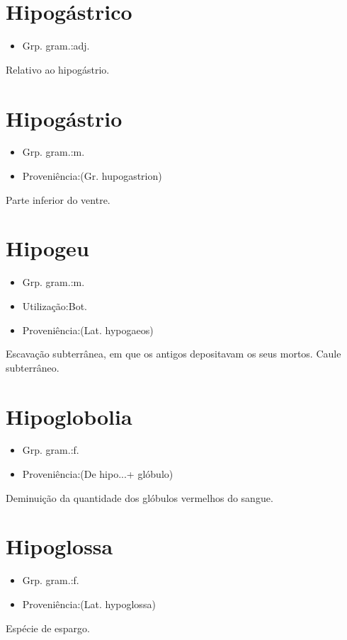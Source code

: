 \documentclass{article}
\begin{document}
\section{Hipogástrico}
\begin{itemize}
\item {Grp. gram.:adj.}
\end{itemize}
Relativo ao hipogástrio.
\section{Hipogástrio}
\begin{itemize}
\item {Grp. gram.:m.}
\end{itemize}
\begin{itemize}
\item {Proveniência:(Gr. \textunderscore hupogastrion\textunderscore )}
\end{itemize}
Parte inferior do ventre.
\section{Hipogeu}
\begin{itemize}
\item {Grp. gram.:m.}
\end{itemize}
\begin{itemize}
\item {Utilização:Bot.}
\end{itemize}
\begin{itemize}
\item {Proveniência:(Lat. \textunderscore hypogaeos\textunderscore )}
\end{itemize}
Escavação subterrânea, em que os antigos depositavam os seus mortos.
Caule subterrâneo.
\section{Hipoglobolia}
\begin{itemize}
\item {Grp. gram.:f.}
\end{itemize}
\begin{itemize}
\item {Proveniência:(De \textunderscore hipo...\textunderscore  + \textunderscore glóbulo\textunderscore )}
\end{itemize}
Deminuição da quantidade dos glóbulos vermelhos do sangue.
\section{Hipoglossa}
\begin{itemize}
\item {Grp. gram.:f.}
\end{itemize}
\begin{itemize}
\item {Proveniência:(Lat. \textunderscore hypoglossa\textunderscore )}
\end{itemize}
Espécie de espargo.
\end{document}
